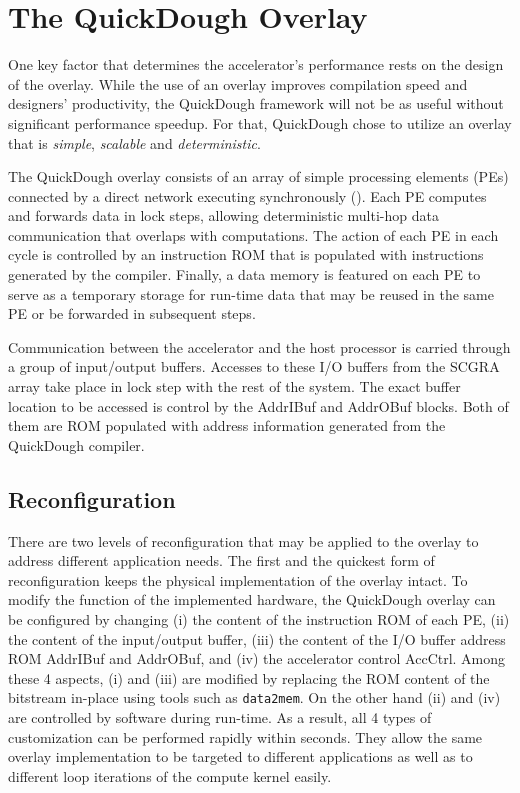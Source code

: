 \section{The QuickDough Overlay} \label{sec:scgraimplement}
One key factor that determines the accelerator's performance rests on the design of the overlay.
While the use of an overlay improves compilation speed and designers' productivity, the QuickDough
framework will not be as useful without significant performance speedup. For that, QuickDough chose
to utilize an overlay that is \emph{simple}, \emph{scalable} and \emph{deterministic}.

The QuickDough overlay consists of an array of simple processing elements (PEs) connected by a
direct network executing synchronously ().
Each PE computes and forwards data in lock steps, allowing deterministic multi-hop data
communication that overlaps with computations.
The action of each PE in each cycle is controlled by an instruction ROM that is populated with
instructions generated by the compiler.
Finally, a data memory is featured on each PE to serve as a temporary storage for run-time data that
may be reused in the same PE or be forwarded in subsequent steps.




Communication between the accelerator and the host processor is carried through a group of input/output buffers.
Accesses to these I/O buffers from the SCGRA array take place in lock step with the rest of the system.
The exact buffer location to be accessed is control by the AddrIBuf and AddrOBuf blocks.  Both of them are ROM populated with address information generated from the QuickDough compiler.


\subsection{Reconfiguration}
There are two levels of reconfiguration that may be applied to the overlay to address different application needs.  The first and the quickest form of reconfiguration keeps the physical implementation of the overlay intact.
To modify the function of the implemented hardware, the QuickDough overlay can be configured by changing (i) the content of the instruction ROM of each PE, (ii) the content of the input/output buffer,  (iii) the content of the I/O buffer address ROM AddrIBuf and AddrOBuf, and (iv) the accelerator control AccCtrl.  Among these 4 aspects, (i) and (iii) are modified by replacing the ROM content of the bitstream in-place using tools such as \texttt{data2mem}.  On the other hand (ii) and (iv) are controlled by software during run-time.  As a result, all 4 types of customization can be performed rapidly within seconds.  They allow the same overlay implementation to be targeted to different applications as well as to different loop iterations of the compute kernel easily.

